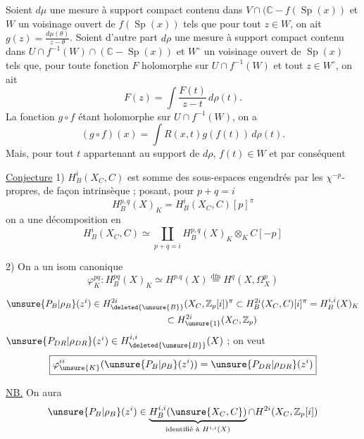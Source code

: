 Soient $d\mu$ une mesure à support compact contenu dans $V\cap(\mathbb C-f(\operatorname{Sp}(x))$ et $W$ un voisinage ouvert de $f(\operatorname{Sp}(x))$ tels que pour tout $z\in W$, on ait $g(z)=\frac{d\mu(\theta)}{z-\theta}$. Soient d'autre part $d\rho$ une mesure à support compact contenu dans $U\cap f^{-1}(W)\cap(\mathbb C-\operatorname{Sp}(x))$ et $W^\circ$ un voisinage ouvert de $\operatorname{Sp}(x)$ tels que, pour toute fonction $F$ holomorphe sur $U\cap f^{-1}(W)$ et tout $z\in W^\circ$, on ait
\[
F(z)=\int\frac{F(t)}{z-t}\,d\rho(t).
\]
La fonction $g\circ f$ étant holomorphe sur $U\cap f^{-1}(W)$, on a
\[
(g\circ f)(x)=\int R(x,t)g(f(t))\,d\rho(t).
\]
Mais, pour tout $t$ appartenant au support de $d\rho$, $f(t)\in W$ et par conséquent



\uline{Conjecture} 1) $H_B^i(X_C,C)$ est somme  des sous-espaces engendrés par les  $\chi^{-p}$-propres, de façon intrinsèque ; posant, pour $p+q=i$
\[
H_B^{p,q}(X)_K=H_B^i(X_C,C)[p]^\pi
\]
on a une décomposition en 
\[
\boxed{H_B^i(X_C,C)\simeq\coprod_{p+q=i}H_B^{p,q}(X)_K\otimes_K C[-p]}
\]

2) On a un isom canonique
\[
\boxed{\varphi_K^{pq}:H_B^{pq}(X)_K\simeq H^{p.q}(X)\overset{\mathrm{dfn}}{=}H^q(X,\Omega_X^p)}
\]


\[
\begin{aligned}
\unsure{P_B|\rho_B}(z^i)&\in H_{\deleted{\unsure{B}}}^{2i}(X_C,\mathbb Z_p[i])^\pi
\subset H_B^{2i}(X_C,C)[i]^\pi=H_B^{i,i}(X)_K\\
&\phantom{\in H^{2i}(X_C,\mathbb Z_p[i])^\pi}\subset H_{\unsure{1}}^{2i}(X_C,\mathbb Z_p)
\end{aligned}
\]
$\unsure{P_{DR}|\rho_{DR}}(z^i)\in H_{\deleted{\unsure{B}}}^{i,i}(X)$ ; on veut
\[
\boxed{\varphi_{\unsure{K}}^{ii}(\unsure{P_B|\rho_B}(z^i))=\unsure{P_{DR}|\rho_{DR}}(z^i)}
\]

\uline{NB.} On aura
\[
\unsure{P_B|\rho_B}(z^i)\in
\underbrace{H_B^{i,i}(\unsure{X_C,C})}_{\text{identifié à }H^{i,i}(X)}
\cap H^{2i}(X_C,\mathbb Z_p[i])
\]




